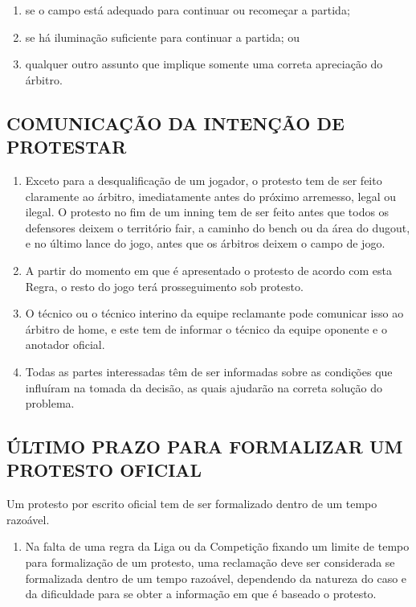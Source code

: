 \begin{multicols}{2}
\begin{enumerate}[label=\alph*)]
	\item  se o campo est\'a adequado para continuar ou recome\c{c}ar a partida; 

	\item  se h\'a ilumina\c{c}\~ao suficiente para continuar a partida; ou 

	\item  qualquer outro assunto que implique somente uma correta aprecia\c{c}\~ao do \'arbitro. 
	\end{enumerate}

\subsection{COMUNICA\c{C}\~AO DA INTEN\c{C}\~AO DE PROTESTAR}

\begin{enumerate}[label=\alph*)]
	\item Exceto para a desqualifica\c{c}\~ao de um jogador, o protesto tem de ser feito claramente ao \'arbitro, imediatamente antes do próximo arremesso, legal ou ilegal. O protesto no fim de um \gls{inning} tem de ser feito antes que todos os defensores deixem o território \gls{fair}, a caminho do \gls{bench} ou da \'area do \Gls{dugout}, e no \'ultimo lance do jogo, antes que os \'arbitros deixem o campo de jogo. 
	\item  A partir do momento em que \'e apresentado o protesto de acordo com esta Regra, o resto do jogo ter\'a prosseguimento sob protesto. 

	\item  O t\'ecnico ou o t\'ecnico interino da equipe reclamante pode comunicar isso ao \'arbitro de \gls{home}, e este tem de informar o t\'ecnico da equipe oponente e o anotador oficial. 

	\item  Todas as partes interessadas t\^em de ser informadas sobre as condi\c{c}\~oes que influ\'iram na tomada da decis\~ao, as quais ajudar\~ao na correta solu\c{c}\~ao do problema. 
	
 \end{enumerate}
 
\subsection{ÚLTIMO PRAZO PARA FORMALIZAR UM PROTESTO OFICIAL}

Um protesto por escrito oficial tem de ser formalizado dentro de um tempo razo\'avel. 

\begin{enumerate}[label=\alph*)]
	\item Na falta de uma regra da Liga ou da Competi\c{c}\~ao fixando um limite de tempo para formaliza\c{c}\~ao de um protesto, uma reclama\c{c}\~ao deve ser considerada se formalizada dentro de um tempo razo\'avel, dependendo da natureza do caso e da dificuldade para 
se obter a informa\c{c}\~ao em que \'e baseado o protesto. 


\end{enumerate}
\end{multicols}
